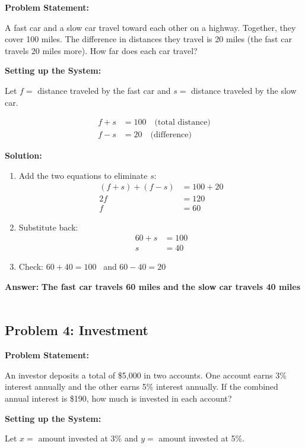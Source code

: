 \documentclass{article}
\begin{document}
\textbf{Problem Statement:}

A fast car and a slow car travel toward each other on a highway. Together, they cover 100 miles. The difference in distances they travel is 20 miles (the fast car travels 20 miles more). How far does each car travel?

\textbf{Setting up the System:}

Let $f =$ distance traveled by the fast car and $s =$ distance traveled by the slow car.

\begin{align*}
f + s &= 100 \quad \text{(total distance)} \\
f - s &= 20 \quad \text{(difference)}
\end{align*}

\textbf{Solution:}

\begin{enumerate}
    \item Add the two equations to eliminate $s$:
    \begin{align*}
        (f + s) + (f - s) &= 100 + 20 \\
        2f &= 120 \\
        f &= 60
    \end{align*}
    \item Substitute back:
    \begin{align*}
        60 + s &= 100 \\
        s &= 40
    \end{align*}
    \item Check: $60 + 40 = 100$ \,  and $60 - 40 = 20$ \, 
\end{enumerate}

\textbf{Answer:} \textbf{The fast car travels 60 miles and the slow car travels 40 miles} \,  

\subsection{Problem 4: Investment}

\textbf{Problem Statement:}

An investor deposits a total of \$5,000 in two accounts. One account earns 3\% interest annually and the other earns 5\% interest annually. If the combined annual interest is \$190, how much is invested in each account?

\textbf{Setting up the System:}

Let $x =$ amount invested at 3\% and $y =$ amount invested at 5\%.
\end{document}
